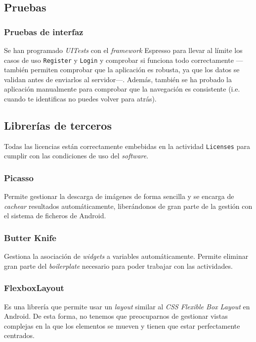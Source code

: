 \documentclass[a4paper,12pt]{article}
\begin{document}
\subsection{Pruebas}
\subsubsection{Pruebas de interfaz}
Se han programado \textit{UITests} con el \textit{framework} Espresso para llevar al límite los casos de uso \texttt{Register} y \texttt{Login} y comprobar si funciona todo correctamente ---también permiten comprobar que la aplicación es robusta, ya que los datos se validan antes de enviarlos al servidor---. Además, también se ha probado la aplicación manualmente para comprobar que la navegación es consistente (i.e. cuando te identificas no puedes volver para atrás).

\vspace{.5cm}
\noindent
{\centering
{}}
\subsection{Librerías de terceros}
Todas las licencias están correctamente embebidas en la actividad \texttt{Licenses} para cumplir con las condiciones de uso del \textit{software}.
\subsubsection{Picasso}
Permite gestionar la descarga de imágenes de forma sencilla y se encarga de \textit{cachear} resultados automáticamente, liberándonos de gran parte de la gestión con el sistema de ficheros de Android.
\subsubsection{Butter Knife}
Gestiona la asociación de \textit{widgets} a variables automáticamente. Permite eliminar gran parte del \textit{boilerplate} necesario para poder trabajar con las actividades.
\subsubsection{FlexboxLayout}
Es una librería que permite usar un \textit{layout} similar al \textit{CSS Flexible Box Layout} en Android. De esta forma, no tenemos que preocuparnos de gestionar vistas complejas en la que los elementos se mueven y tienen que estar perfectamente centrados.
\end{document}
